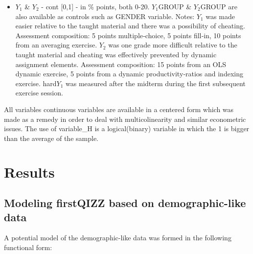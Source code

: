 \documentclass[]{article}
\begin{document}
\begin{itemize}
		Depended variable
		\vspace{1em}
		\item $Y_1$ \& $Y_2$ - cont [0,1] - in \% points, both 0-20.
		 \subitem $Y_1$GROUP \& $Y_2$GROUP are also available as controls such as GENDER variable.  
		 \subitem Notes:
		 \subsubitem $Y_1$ was made easier relative to the taught material and there was a possibility of cheating. Assessment composition: 5 points multiple‑choice, 5 points fill‑in, 10 points from an averaging exercise.
		 \subsubitem $Y_2$ was one grade more difficult relative to the taught material and cheating was effectively prevented by dynamic assignment elements. Assessment composition: 15 points from an OLS dynamic exercise, 5 points from a dynamic productivity‑ratios and indexing exercise.
		 \subsubitem hard$Y_1$ was measured after the midterm during the first subsequent exercise session.
		 
 	\end{itemize}
	
	
	All variables continuous variables are available in a centered form which was made as a remedy in order to deal with multicolinearity and similar econometric issues. The use of variable\_H is a logical(binary) variable in which the 1 is bigger than the average of the sample.  
	
	
	\section{Results}
	
	\subsection{Modeling firstQIZZ based on demographic-like data}
	A potential model of the demographic-like data was formed in the following functional form:
	
\end{document}
